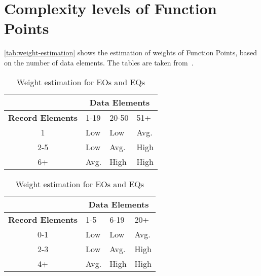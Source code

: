 \section{Complexity levels of Function Points}
\autoref{tab:weight-estimation} shows the estimation of weights of Function Points, based on the number of data elements. The tables are taken from~\cite{cocomo-manual}.

\begin{table}[h]
\centering
\begin{subtable}{\textwidth}
    \centering
    \begin{tabular}{| c | l | l | l |}
        \hline
         & \multicolumn{3}{c|}{\textbf{Data Elements}} \\
        \hline
        \textbf{Record Elements} & 1-19 & 20-50 & 51+ \\
        \hline
        1       & Low     & Low     & Avg.     \\
        2-5     & Low     & Avg.    & High     \\
        6+      & Avg.    & High    & High     \\
        \hline
    \end{tabular}
    \caption{Weight estimation for ILFs and EIFs.}
\end{subtable}

\vspace{2em}

\begin{subtable}{\textwidth}
    \centering
    \begin{tabular}{| c | l | l | l |}
        \hline
         & \multicolumn{3}{c|}{\textbf{Data Elements}} \\
        \hline
        \textbf{Record Elements} & 1-5 & 6-19 & 20+ \\
        \hline
        0-1     & Low     & Low     & Avg.     \\
        2-3     & Low     & Avg.    & High     \\
        4+      & Avg.    & High    & High     \\
        \hline
    \end{tabular}
    \caption{Weight estimation for EOs and EQs}
\end{subtable}

\vspace{2em}


\end{table}
